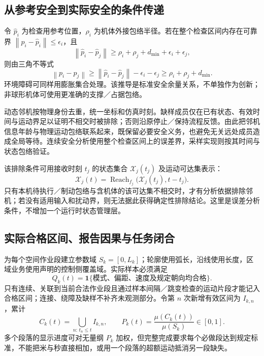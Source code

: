 \documentclass[UTF8,fontset=fandol,a4paper,11pt]{ctexart}
\newcommand{\ind}{\mathbf 1}
\newcommand{\norm}[1]{\left\lVert #1\right\rVert}
\begin{document}
\subsection{从参考安全到实际安全的条件传递}

令 $\widehat p_i$ 为检查用参考位置，$\rho_i$ 为机体外接包络半径。若在整个检查区间内存在可靠界 $\norm{p_i-\widehat p_i}\leq\epsilon_i$，且
\begin{equation}
 \norm{\widehat p_i-\widehat p_j}
       \geq\rho_i+\rho_j+d_{\min}+\epsilon_i+\epsilon_j,
 \label{eq:referencesafety}
\end{equation}
则由三角不等式
\begin{equation}
 \norm{p_i-p_j}\geq
 \norm{\widehat p_i-\widehat p_j}-\epsilon_i-\epsilon_j
       \geq\rho_i+\rho_j+d_{\min}.
 \label{eq:actualsafety}
\end{equation}
环境障碍可同样用膨胀集合处理。该推导是标准安全余量关系，不单独作为创新；非球形机体可使用更准确的支撑／占据包络。

动态邻机按物理身份去重，统一坐标和仿真时刻。缺样成员仅在已有状态、有效时间与运动界足以证明不相交时被排除；否则沿原停止／保持流程反馈。由此把邻机信息年龄与物理运动包络联系起来，既保留必要安全义务，也避免无关远处成员造成全局等待。连续安全分析使用整个检查区间上的误差界，采样实现则按其时间与状态包络验证。

该排除条件可用接收时刻 $t_j$ 的状态集合 $\mathcal X_j(t_j)$ 及运动可达集表示：
\begin{equation}
 \mathcal X_j(t)=\operatorname{Reach}_{f_j}
                      \bigl(\mathcal X_j(t_j),t-t_j\bigr).
 \label{eq:peerreach}
\end{equation}
只有本机待执行／制动包络与含机体的该可达集不相交时，才有分析依据排除邻机；若没有适用输入和扰动界，则无法据此获得确定性排除结论。这里是误差分析条件，不增加一个运行时状态管理层。

\subsection{实际合格区间、报告因果与任务闭合}

为每个空间作业段建立参数域 $S_k=[0,L_k]$；轮廓使用弧长，沿线使用长度，区域业务使用声明的控制侧覆盖域。实际样本必须满足
\begin{equation}
 Q_k(t)=\ind\{\text{模式、偏距、速度及规定朝向均合格}\}.
 \label{eq:qualified}
\end{equation}
只有连续、关联到当前合法作业段且通过样本间隔／跳变检查的运动片段才能记入合格区间；连接、绕障及缺样不补齐未观测部分。令第 $n$ 次新增有效区间为 $I_{k,n}$，累计
\begin{equation}
 C_k(t)=\bigcup_{n:\,t_n\leq t} I_{k,n},\qquad
 P_k(t)=\frac{\mu(C_k(t))}{\mu(S_k)}\in[0,1].
 \label{eq:unionprogress}
\end{equation}
多个段落的显示进度可对无量纲 $P_k$ 加权，但完整完成要求每个必做段达到规定标准，不能把米与秒直接相加，或用一个段落的超额运动抵消另一段缺失。
\end{document}

